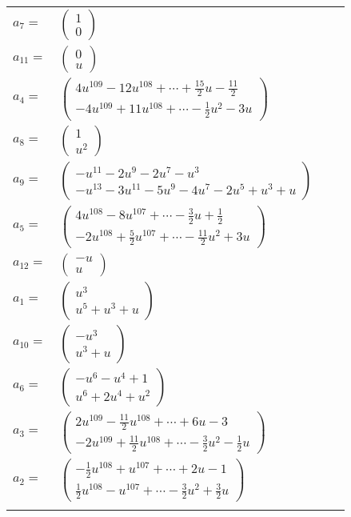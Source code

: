 \documentclass[1p]{elsarticle_modified}
\theoremstyle{definition}
\begin{document}
\begin{tabular}{m{7pt} m{180pt} m{7pt} m{180pt} }
\flushright $a_{7}=$&$\begin{pmatrix}1\\0\end{pmatrix}$ \\
\flushright $a_{11}=$&$\begin{pmatrix}0\\u\end{pmatrix}$ \\
\flushright $a_{4}=$&$\begin{pmatrix}4 u^{109}-12 u^{108}+\cdots+\frac{15}{2} u-\frac{11}{2}\\-4 u^{109}+11 u^{108}+\cdots-\frac{1}{2} u^2-3 u\end{pmatrix}$ \\
\flushright $a_{8}=$&$\begin{pmatrix}1\\u^2\end{pmatrix}$ \\
\flushright $a_{9}=$&$\begin{pmatrix}- u^{11}-2 u^9-2 u^7- u^3\\- u^{13}-3 u^{11}-5 u^9-4 u^7-2 u^5+u^3+u\end{pmatrix}$ \\
\flushright $a_{5}=$&$\begin{pmatrix}4 u^{108}-8 u^{107}+\cdots-\frac{3}{2} u+\frac{1}{2}\\-2 u^{108}+\frac{5}{2} u^{107}+\cdots-\frac{11}{2} u^2+3 u\end{pmatrix}$ \\
\flushright $a_{12}=$&$\begin{pmatrix}- u\\u\end{pmatrix}$ \\
\flushright $a_{1}=$&$\begin{pmatrix}u^3\\u^5+u^3+u\end{pmatrix}$ \\
\flushright $a_{10}=$&$\begin{pmatrix}- u^3\\u^3+u\end{pmatrix}$ \\
\flushright $a_{6}=$&$\begin{pmatrix}- u^6- u^4+1\\u^6+2 u^4+u^2\end{pmatrix}$ \\
\flushright $a_{3}=$&$\begin{pmatrix}2 u^{109}-\frac{11}{2} u^{108}+\cdots+6 u-3\\-2 u^{109}+\frac{11}{2} u^{108}+\cdots-\frac{3}{2} u^2-\frac{1}{2} u\end{pmatrix}$ \\
\flushright $a_{2}=$&$\begin{pmatrix}-\frac{1}{2} u^{108}+u^{107}+\cdots+2 u-1\\\frac{1}{2} u^{108}- u^{107}+\cdots-\frac{3}{2} u^2+\frac{3}{2} u\end{pmatrix}$\\&\end{tabular}
\end{document}
